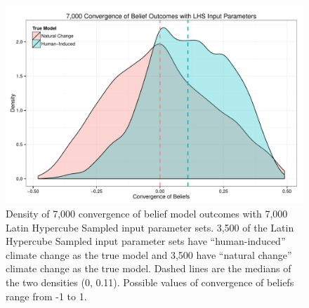 \documentclass{article}\usepackage[]{graphicx}\usepackage[]{color}
\makeatletter
\def\maxwidth{ %
  \ifdim\Gin@nat@width>\linewidth
    \linewidth
  \else
    \Gin@nat@width
  \fi
}
\newenvironment{knitrout}{}{} %
\makeatother
\begin{document}
\begin{figure}
\centering
\begin{knitrout}
\color{fgcolor}
\includegraphics[width=\maxwidth]{figure/hist-1} 

\end{knitrout}
\caption{Density of 7,000 convergence of belief model outcomes with 7,000 Latin Hypercube Sampled input parameter sets. 3,500 of the Latin Hypercube Sampled input parameter sets have ``human-induced'' climate change as the true model and 3,500 have ``natural change'' climate change as the true model. Dashed lines are the medians of the two densities (0, 0.11). Possible values of convergence of beliefs range from -1 to 1.}
\label{fig:hist}
\end{figure}
\end{document}
